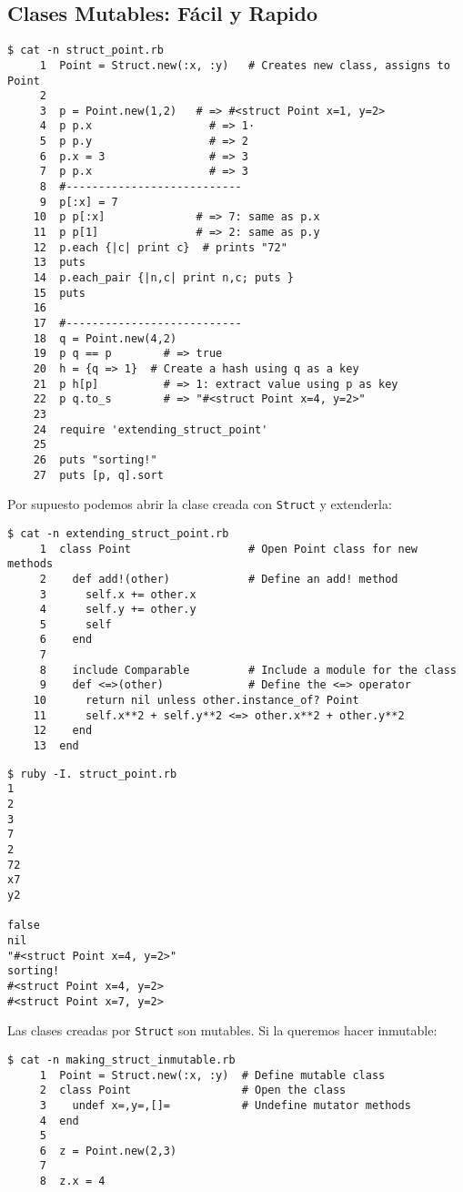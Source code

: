 \subsection{Clases Mutables: Fácil y Rapido}

\begin{verbatim}
$ cat -n struct_point.rb 
     1  Point = Struct.new(:x, :y)   # Creates new class, assigns to Point
     2  
     3  p = Point.new(1,2)   # => #<struct Point x=1, y=2>
     4  p p.x                  # => 1·
     5  p p.y                  # => 2
     6  p.x = 3                # => 3
     7  p p.x                  # => 3
     8  #---------------------------
     9  p[:x] = 7         
    10  p p[:x]              # => 7: same as p.x
    11  p p[1]               # => 2: same as p.y
    12  p.each {|c| print c}  # prints "72"
    13  puts
    14  p.each_pair {|n,c| print n,c; puts } 
    15  puts
    16  
    17  #---------------------------
    18  q = Point.new(4,2)
    19  p q == p        # => true
    20  h = {q => 1}  # Create a hash using q as a key
    21  p h[p]          # => 1: extract value using p as key
    22  p q.to_s        # => "#<struct Point x=4, y=2>"
    23  
    24  require 'extending_struct_point'
    25  
    26  puts "sorting!"
    27  puts [p, q].sort

\end{verbatim}
Por supuesto podemos abrir la clase creada con \verb|Struct| y extenderla:
\begin{verbatim}
$ cat -n extending_struct_point.rb 
     1  class Point                  # Open Point class for new methods
     2    def add!(other)            # Define an add! method
     3      self.x += other.x
     4      self.y += other.y
     5      self
     6    end
     7  
     8    include Comparable         # Include a module for the class
     9    def <=>(other)             # Define the <=> operator
    10      return nil unless other.instance_of? Point
    11      self.x**2 + self.y**2 <=> other.x**2 + other.y**2
    12    end
    13  end
\end{verbatim}

\begin{verbatim}
$ ruby -I. struct_point.rb 
1
2
3
7
2
72
x7
y2

false
nil
"#<struct Point x=4, y=2>"
sorting!
#<struct Point x=4, y=2>
#<struct Point x=7, y=2>

\end{verbatim}
Las clases creadas por \verb|Struct| son mutables. Si la queremos hacer inmutable:
\begin{verbatim}
$ cat -n making_struct_inmutable.rb 
     1  Point = Struct.new(:x, :y)  # Define mutable class
     2  class Point                 # Open the class
     3    undef x=,y=,[]=           # Undefine mutator methods
     4  end
     5  
     6  z = Point.new(2,3)
     7  
     8  z.x = 4
\end{verbatim}


